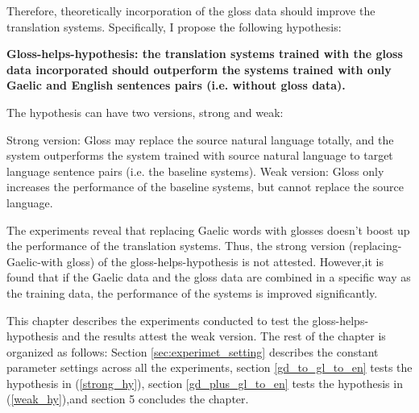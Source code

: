\documentclass[a4paper]{article}
\begin{document}
Therefore, theoretically incorporation of the gloss data should improve the translation systems. Specifically, I propose the following hypothesis:
\begin{exe}  
\ex \textbf{Gloss-helps-hypothesis: the translation systems trained with the gloss data incorporated should outperform the systems trained with only Gaelic and English sentences pairs (i.e. without gloss data).}

The hypothesis can have two versions, strong and weak:
	\begin{xlist}
	\ex \label{strong_hy} Strong version: Gloss may replace the source natural language totally, and the system outperforms the system trained with source natural language to target language sentence pairs (i.e. the baseline systems).   
	\ex \label{weak_hy} Weak version: Gloss only increases the performance of the baseline systems, but cannot replace the source language. 
	\end{xlist}
\end{exe}

The experiments reveal that replacing Gaelic words with glosses doesn't boost up the performance of the translation systems. Thus, the strong version (replacing-Gaelic-with gloss) of the gloss-helps-hypothesis is not attested. However,it is found that if the Gaelic data and the gloss data are combined in a specific way as the training data, the performance of the systems is improved significantly.  

This chapter describes the experiments conducted to test the gloss-helps-hypothesis and the results attest the weak version. 
The rest of the chapter is organized as follows: Section \ref{sec:experimet_setting} describes the constant parameter settings across all the experiments, section \ref{gd_to_gl_to_en} tests the hypothesis in (\ref{strong_hy}), section \ref{gd_plus_gl_to_en} tests the hypothesis in (\ref{weak_hy}),and section 5 concludes the chapter.  

\end{document}
